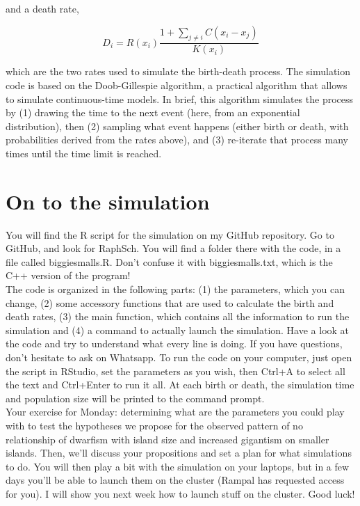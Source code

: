 \documentclass[12pt]{article}
\begin{document}
and a death rate,

\[
D_i = R(x_i) \frac{1 + \sum_{j \neq i} C(x_i - x_j)}{K(x_i)}
\]

which are the two rates used to simulate the birth-death process. The simulation code is based on the Doob-Gillespie algorithm, a practical algorithm that allows to simulate continuous-time models. In brief, this algorithm simulates the process by (1) drawing the time to the next event (here, from an exponential distribution), then (2) sampling what event happens (either birth or death, with probabilities derived from the rates above), and (3) re-iterate that process many times until the time limit is reached.





\section{On to the simulation}

You will find the R script for the simulation on my GitHub repository. Go to GitHub, and look for RaphSch. You will find a folder there with the code, in a file called biggiesmalls.R. Don't confuse it with biggiesmalls.txt, which is the C++ version of the program!\\

The code is organized in the following parts: (1) the parameters, which you can change, (2) some accessory functions that are used to calculate the birth and death rates, (3) the main function, which contains all the information to run the simulation and (4) a command to actually launch the simulation. Have a look at the code and try to understand what every line is doing. If you have questions, don't hesitate to ask on Whatsapp. To run the code on your computer, just open the script in RStudio, set the parameters as you wish, then Ctrl+A to select all the text and Ctrl+Enter to run it all. At each birth or death, the simulation time and population size will be printed to the command prompt.\\

Your exercise for Monday: determining what are the parameters you could play with to test the hypotheses we propose for the observed pattern of no relationship of dwarfism with island size and increased gigantism on smaller islands. Then, we'll discuss your propositions and set a plan for what simulations to do. You will then play a bit with the simulation on your laptops, but in a few days you'll be able to launch them on the cluster (Rampal has requested access for you). I will show you next week how to launch stuff on the cluster. Good luck!\\
\end{document}
